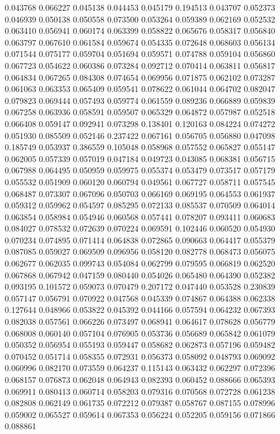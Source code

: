 0.043768
0.066227
0.045138
0.044453
0.045179
0.194513
0.043707
0.052373
0.046939
0.050138
0.050558
0.073500
0.053264
0.059389
0.062169
0.052532
0.063410
0.056941
0.060174
0.063399
0.058822
0.065676
0.058317
0.056840
0.063797
0.067610
0.061584
0.059674
0.054335
0.072648
0.068603
0.056134
0.071544
0.075177
0.059704
0.051694
0.059571
0.074788
0.059104
0.056860
0.067723
0.054622
0.060386
0.073284
0.092712
0.070414
0.063811
0.056817
0.064834
0.067265
0.084308
0.074654
0.069956
0.071875
0.062102
0.073287
0.061063
0.063353
0.065409
0.059541
0.078622
0.061044
0.064702
0.082047
0.079823
0.069444
0.057493
0.059774
0.061559
0.089236
0.066889
0.059839
0.067258
0.063936
0.058591
0.059507
0.065329
0.064872
0.057987
0.052518
0.066408
0.059147
0.092941
0.073298
0.138401
0.120163
0.084224
0.074272
0.051930
0.085509
0.052146
0.237422
0.067161
0.056705
0.056880
0.047098
0.185749
0.053937
0.386559
0.105048
0.058968
0.057552
0.065827
0.055147
0.062005
0.057339
0.057019
0.047184
0.049723
0.043085
0.068381
0.056715
0.067988
0.064495
0.050959
0.059975
0.055374
0.053479
0.073517
0.057179
0.055532
0.051909
0.060120
0.060794
0.049561
0.067727
0.058711
0.057545
0.068487
0.073307
0.067096
0.050703
0.066169
0.069195
0.064553
0.061937
0.059312
0.059962
0.054597
0.085295
0.072133
0.085537
0.070509
0.064014
0.063854
0.058984
0.054946
0.060568
0.057441
0.078207
0.093411
0.060683
0.084027
0.078532
0.072639
0.070224
0.069591
0.102446
0.060520
0.054930
0.070234
0.074895
0.071414
0.064838
0.072865
0.090663
0.064417
0.055379
0.087085
0.059027
0.069509
0.096956
0.058120
0.082778
0.068473
0.056075
0.062677
0.062035
0.099743
0.054084
0.062799
0.079595
0.066819
0.062520
0.067868
0.067942
0.047159
0.080440
0.054026
0.065480
0.064390
0.052382
0.093195
0.101572
0.059073
0.070479
0.207172
0.047440
0.053528
0.230839
0.057147
0.056791
0.070922
0.047568
0.045339
0.074867
0.064388
0.062338
0.127644
0.048966
0.053822
0.045392
0.044166
0.057594
0.064232
0.067393
0.082038
0.057561
0.066226
0.073497
0.068941
0.064617
0.078628
0.056779
0.068008
0.060140
0.057104
0.076905
0.053736
0.056689
0.065842
0.061079
0.050352
0.056954
0.055193
0.059447
0.058682
0.062873
0.057196
0.059482
0.070452
0.051714
0.058355
0.072931
0.056373
0.058092
0.048793
0.069092
0.060996
0.082170
0.073559
0.064237
0.115143
0.063432
0.062297
0.072396
0.068157
0.076873
0.062048
0.064943
0.082393
0.060452
0.088666
0.065393
0.069911
0.080413
0.060714
0.058203
0.079316
0.070568
0.072728
0.061238
0.082808
0.062149
0.061735
0.072212
0.079387
0.058767
0.087155
0.078996
0.059002
0.065527
0.059614
0.067353
0.056224
0.052205
0.059156
0.071866
0.088861
